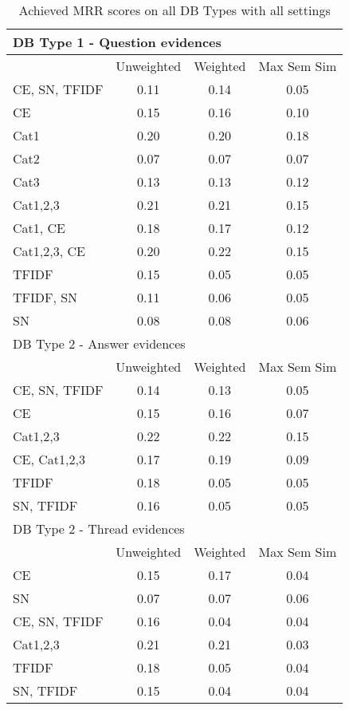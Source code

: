 \documentclass[conference]{IEEEtran}
\begin{document}
\begin{table*}[!h]
	\centering
	\renewcommand{\arraystretch}{1.3}
	\caption{Achieved MRR scores on all DB Types with all settings}
	\label{tab:resultsmrr0}
	\begin{tabular}{l||ccc}\hline
	
		\multicolumn{4}{l}{DB Type 1 - Question evidences}\\\hline\hline
		& Unweighted & Weighted & Max Sem Sim\\
		CE, SN, TFIDF & 0.11 & 0.14 & 0.05\\
		CE & 0.15 & 0.16 & 0.10\\
		Cat1 & 0.20 & 0.20 & 0.18\\
		Cat2 & 0.07 & 0.07 & 0.07\\
		Cat3 & 0.13 & 0.13 & 0.12\\
		Cat1,2,3 & 0.21 & 0.21 & 0.15\\
		Cat1, CE & 0.18 & 0.17 & 0.12\\
		Cat1,2,3, CE & 0.20 & 0.22 & 0.15\\
		TFIDF & 0.15 & 0.05 & 0.05\\
		TFIDF, SN & 0.11 & 0.06 & 0.05\\
		SN & 0.08 & 0.08 & 0.06\\
		\hline
		
		\multicolumn{4}{l}{DB Type 2 - Answer evidences}\\\hline\hline
		& Unweighted & Weighted & Max Sem Sim\\
		CE, SN, TFIDF & 0.14 & 0.13 & 0.05\\
		CE & 0.15 & 0.16 & 0.07\\
		Cat1,2,3 & 0.22 & 0.22 & 0.15\\
		CE, Cat1,2,3 & 0.17 & 0.19 & 0.09\\
		TFIDF & 0.18 & 0.05 & 0.05\\
		SN, TFIDF & 0.16 & 0.05 & 0.05\\
		\hline
		
		\multicolumn{4}{l}{DB Type 2 - Thread evidences}\\\hline\hline
		& Unweighted & Weighted & Max Sem Sim\\
		CE & 0.15 & 0.17 & 0.04\\
		SN & 0.07 & 0.07 & 0.06\\
		CE, SN, TFIDF & 0.16 & 0.04 & 0.04\\
		Cat1,2,3 & 0.21 & 0.21 & 0.03\\
		TFIDF & 0.18 & 0.05 & 0.04\\
		SN, TFIDF & 0.15 & 0.04 & 0.04\\
		\hline
		

\end{tabular}
\end{table*}
\end{document}

